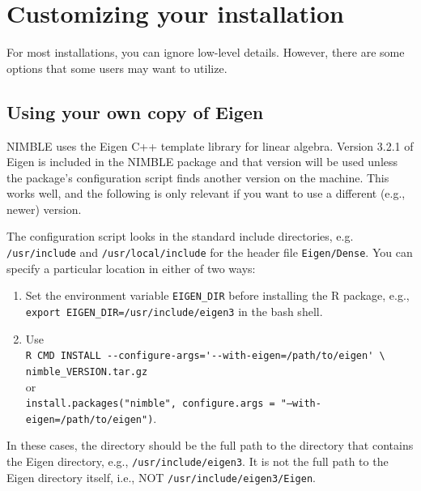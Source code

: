 \documentclass[12pt,oneside]{book}\usepackage[]{graphicx}\usepackage[]{color}
\def\cd#1{\texttt{#1}}
\begin{document}
\section{Customizing your installation}

For most installations, you can ignore low-level details.
However, there are some options that some users may want to utilize.

\subsection{Using your own copy of Eigen}
NIMBLE uses the Eigen C++ template library for linear algebra.  Version 3.2.1
of Eigen is included in the NIMBLE package and that version will be
used unless the package's configuration script finds another version
on the machine.  This works well, and the following is only relevant
if you want to use a different (e.g., newer) version.

The configuration script looks in the standard include directories,
e.g. \cd{/usr/include} and \cd{/usr/local/include} for the header file \cd{Eigen/Dense}.
You can specify a particular location in either of two ways:
\begin{enumerate}
  \item Set the environment variable \cd{EIGEN\_DIR} before installing the R
    package,  e.g., \cd{export EIGEN\_DIR=/usr/include/eigen3} in the bash shell.
  \item Use \\
    \verb|R CMD INSTALL --configure-args='--with-eigen=/path/to/eigen' \| \\
    \verb|nimble_VERSION.tar.gz| \\
      or \\ \cd{install.packages("nimble", configure.args = "--with-eigen=/path/to/eigen")}.
\end{enumerate}  
In these cases, the directory should be the full path to the directory that
contains the Eigen directory, e.g., \cd{/usr/include/eigen3}. It is not the full path to the Eigen
directory itself, i.e., NOT \cd{/usr/include/eigen3/Eigen}.
\end{document}
